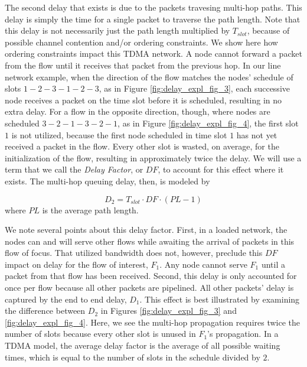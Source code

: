 The second delay that exists is due to the packets travesing multi-hop paths. This delay is simply the time for a single packet to traverse the path length. Note that this delay is not necessarily just the path length multiplied by $T_{slot}$, because of possible channel contention and/or ordering constraints. We show here how ordering constraints impact this TDMA network. A node cannot forward a packet from the flow until it receives that packet from the previous hop. In our line network example, when the direction of the flow matches the nodes' schedule of slots $1-2-3-1-2-3$, as in Figure \ref{fig:delay_expl_fig_3}, each successive node receives a packet on the time slot before it is scheduled, resulting in no extra delay. For a flow in the opposite direction, though, where nodes are scheduled $3-2-1-3-2-1$, as in Figure \ref{fig:delay_expl_fig_4}, the first slot $1$ is not utilized, because the first node scheduled in time slot $1$ has not yet received a packet in the flow. Every other slot is wasted, on average, for the initialization of the flow, resulting in approximately twice the delay. We will use a term that we call the \emph{Delay Factor}, or $DF$, to account for this effect where it exists. The multi-hop queuing delay, then, is modeled by

\begin{equation}
	D_2 = T_{slot} \cdot DF \cdot (PL - 1)
\end{equation}
where $PL$ is the average path length.

We note several points about this delay factor.  First, in a loaded network, the nodes can and will serve other flows while awaiting the arrival of packets in this flow of focus. That utilized bandwidth does not, however, preclude this $DF$ impact on delay for the flow of interest, $F_1$.  Any node cannot serve $F_1$ until a packet from that flow has been received. Second, this delay is only accounted for once per flow because all other packets are pipelined. All other packets' delay is captured by the end to end delay, $D_1$.  This effect is best illustrated by examining the difference between $D_2$ in Figures \ref{fig:delay_expl_fig_3} and \ref{fig:delay_expl_fig_4}. Here, we see the multi-hop propagation requires twice the number of slots because every other slot is unused in $F_1$'s propagation.  In a TDMA model, the average delay factor is the average of all possible waiting times, which is equal to the number of slots in the schedule divided by $2$.

